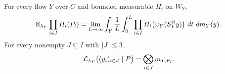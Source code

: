 \begin{proposition}
\label{prop:selected-parameters}
For every flow $Y$ over $C$ and bounded measurable $H_i$ on $W_Y$,
\begin{equation}\label{eq:deterministic-parameters}
 \mathbb E_{\lambda_Y}\prod_{i\in I}H_i(P_i)
 =\lim_{L\to\infty}\int_Y\frac1L\int_0^L
   \prod_{i\in I}H_i\bigl(\omega_Y(S_Y^{it}y)\bigr)
   \,\,d t\,\,d m_Y(y).
\end{equation}
For every nonempty $J\subseteq I$ with $\lvert J\rvert\le3$,
\begin{equation}\label{eq:small-conditional-law}
 \mathcal L_{\lambda_Y}\bigl((y_i)_{i\in J}\mid P\bigr)
   =\bigotimes_{i\in J}m_{Y,P_i}.
\end{equation}
\end{proposition}

